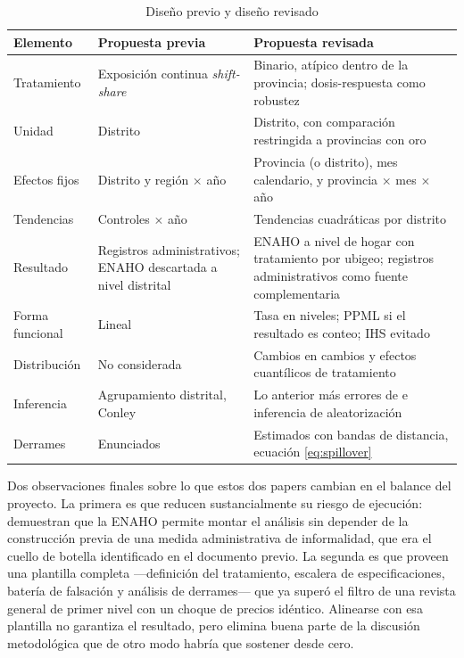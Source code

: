 \documentclass[11pt,a4paper]{article}
\begin{document}
\begin{table}[h!]
\centering
\singlespacing
\caption{Diseño previo y diseño revisado}
\label{tab:resumen}
\small
\begin{tabularx}{\textwidth}{L{3.1cm} L{4.6cm} X}
\toprule
\textbf{Elemento} & \textbf{Propuesta previa} & \textbf{Propuesta revisada} \\
\midrule
Tratamiento & Exposición continua \emph{shift-share} & Binario, atípico dentro de la provincia; dosis-respuesta como robustez \\
\addlinespace
Unidad & Distrito & Distrito, con comparación restringida a provincias con oro \\
\addlinespace
Efectos fijos & Distrito y región $\times$ año & Provincia (o distrito), mes calendario, y provincia $\times$ mes $\times$ año \\
\addlinespace
Tendencias & Controles $\times$ año & Tendencias cuadráticas por distrito \\
\addlinespace
Resultado & Registros administrativos; ENAHO descartada a nivel distrital & ENAHO a nivel de hogar con tratamiento por ubigeo; registros administrativos como fuente complementaria \\
\addlinespace
Forma funcional & Lineal & Tasa en niveles; PPML si el resultado es conteo; IHS evitado \\
\addlinespace
Distribución & No considerada & Cambios en cambios y efectos cuantílicos de tratamiento \\
\addlinespace
Inferencia & Agrupamiento distrital, Conley & Lo anterior más errores de \citet{adao2019} e inferencia de aleatorización \\
\addlinespace
Derrames & Enunciados & Estimados con bandas de distancia, ecuación \eqref{eq:spillover} \\
\bottomrule
\end{tabularx}
\end{table}

Dos observaciones finales sobre lo que estos dos papers cambian en el balance del proyecto. La primera es que reducen sustancialmente su riesgo de ejecución: \citet{pecastaing2020} demuestran que la ENAHO permite montar el análisis sin depender de la construcción previa de una medida administrativa de informalidad, que era el cuello de botella identificado en el documento previo. La segunda es que \citet{braakmann2024} proveen una plantilla completa ---definición del tratamiento, escalera de especificaciones, batería de falsación y análisis de derrames--- que ya superó el filtro de una revista general de primer nivel con un choque de precios idéntico. Alinearse con esa plantilla no garantiza el resultado, pero elimina buena parte de la discusión metodológica que de otro modo habría que sostener desde cero.
\end{document}
